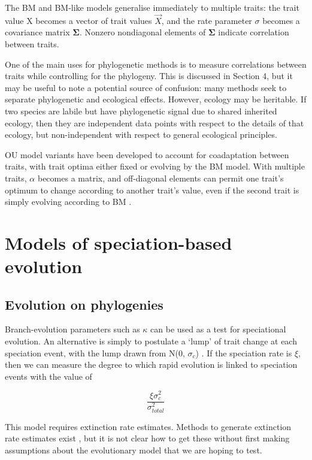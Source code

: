 \documentclass[12pt]{article}
\begin{document}
The BM and BM-like models generalise immediately to multiple traits: the trait value X becomes a vector of trait values $\overrightarrow{X}$, and the rate parameter $\sigma$ becomes a covariance matrix $\boldsymbol{\Sigma}$. 
Nonzero nondiagonal elements of $\boldsymbol{\Sigma}$ indicate correlation between traits. 

One of the main uses for phylogenetic methods is to measure correlations between traits while controlling for the phylogeny. 
This is discussed in Section 4, but it may be useful to note a potential source of confusion: many methods seek to separate phylogenetic and ecological effects. However, ecology may be heritable. 
If two species are labile but have phylogenetic signal due to shared inherited ecology, then they are independent data points with respect to the details of that ecology, but non-independent with respect to general ecological principles.
 
OU model variants have been developed to account for coadaptation between traits, with trait optima either fixed or evolving by the BM model. 
With multiple traits, $\alpha$ becomes a matrix, and off-diagonal elements can permit one trait's optimum to change according to another trait's value, even if the second trait is simply evolving according to BM \citep{bartoszek_phylogenetic_2012}.

\section{Models of speciation-based evolution}

\subsection{Evolution on phylogenies}

Branch-evolution parameters such as $\kappa$ can be used as a test for speciational evolution. 
An alternative is simply to postulate a `lump' of trait change at each speciation event, with the lump drawn from N(0, $\sigma_c$) \citep{bokma_detection_2008, ingram_speciation_2010}. 
If the speciation rate is $\xi$, then we can measure the degree to which rapid evolution is linked to speciation events with the value of

\begin{equation}
	\frac{\xi \sigma^2_c}{\sigma^2_{total}}   %
\end{equation}

This model requires extinction rate estimates. 
Methods to generate extinction rate estimates exist \citep{rabosky_heritability_2009,pybus_testing_2000}, but it is not clear how to get these without first making assumptions about the evolutionary model that we are hoping to test.
\end{document}
